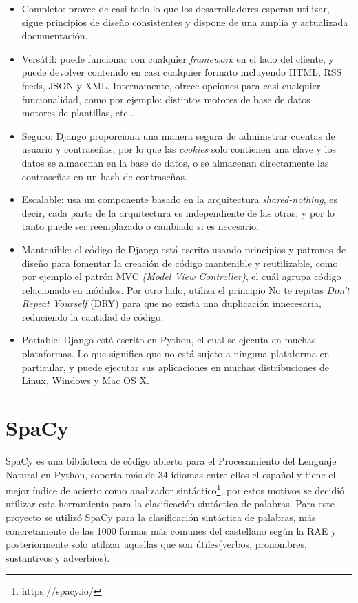 \begin{itemize}
	\item Completo: provee de casi todo lo que los desarrolladores esperan utilizar, sigue principios de diseño consistentes y dispone de una amplia y actualizada documentación.
	\item Versátil: puede funcionar con cualquier \textit{framework} en el lado del cliente, y puede devolver contenido en casi cualquier formato incluyendo HTML, RSS feeds, JSON y XML. Internamente, ofrece opciones para casi cualquier funcionalidad, como por ejemplo: distintos motores de base de datos , motores de plantillas, etc...
	\item Seguro: Django proporciona una manera segura de administrar cuentas de usuario y contraseñas, por lo que las \textit{cookies} solo contienen una clave y los datos se almacenan en la base de datos, o se almacenan directamente las contraseñas en un hash de contraseñas.
	\item Escalable: usa un componente basado en la arquitectura \textit{shared-nothing}, es decir, cada parte de la arquitectura es independiente de las otras, y por lo tanto puede ser reemplazado o cambiado si es necesario.
	\item Mantenible: el código de Django está escrito usando principios y patrones de diseño para fomentar la creación de código mantenible y reutilizable, como por ejemplo el patrón MVC \textit{(Model View Controller)}, el cuál agrupa código relacionado en módulos.  Por otro lado, utiliza el principio No te repitas \textit{Don't Repeat Yourself} (DRY) para que no exista una duplicación innecesaria, reduciendo la cantidad de código. 
	\item Portable: Django está escrito en Python, el cual se ejecuta en muchas plataformas. Lo que significa que no está sujeto a ninguna plataforma en particular, y puede ejecutar sus aplicaciones en muchas distribuciones de Linux, Windows y Mac OS X.
\end{itemize}

\section{SpaCy}
\label{cap:sec:spacy}
SpaCy es una biblioteca de código abierto para el Procesamiento del Lenguaje Natural en Python, soporta más de 34 idiomas entre ellos el español y tiene el mejor índice de acierto como analizador sintáctico\footnote{https://spacy.io/}, por estos motivos se decidió utilizar esta herramienta para la clasificación sintáctica de palabras.
Para este proyecto se utilizó SpaCy para la clasificación sintáctica de palabras, más concretamente de las 1000 formas más comunes del castellano según la RAE y posteriormente solo utilizar aquellas que son útiles(verbos, pronombres, sustantivos y adverbios).

